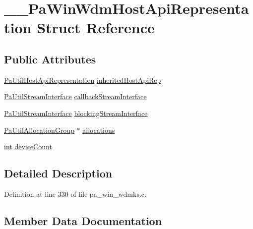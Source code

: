 \hypertarget{struct_____pa_win_wdm_host_api_representation}{}\section{\+\_\+\+\_\+\+Pa\+Win\+Wdm\+Host\+Api\+Representation Struct Reference}
\label{struct_____pa_win_wdm_host_api_representation}
\subsection*{Public Attributes}
\begin{DoxyCompactItemize}
\item 
\hyperlink{struct_pa_util_host_api_representation}{Pa\+Util\+Host\+Api\+Representation} \hyperlink{struct_____pa_win_wdm_host_api_representation_a73b6839eeeedfad62406b6929c26d3ad}{inherited\+Host\+Api\+Rep}
\item 
\hyperlink{struct_pa_util_stream_interface}{Pa\+Util\+Stream\+Interface} \hyperlink{struct_____pa_win_wdm_host_api_representation_af4dec3b34a520b1b2aa393fbca9e2c9e}{callback\+Stream\+Interface}
\item 
\hyperlink{struct_pa_util_stream_interface}{Pa\+Util\+Stream\+Interface} \hyperlink{struct_____pa_win_wdm_host_api_representation_a040a7b4993995b26c9128826a8644050}{blocking\+Stream\+Interface}
\item 
\hyperlink{struct_pa_util_allocation_group}{Pa\+Util\+Allocation\+Group} $\ast$ \hyperlink{struct_____pa_win_wdm_host_api_representation_aefaac80ee7c20f6ab43463d2a153d64c}{allocations}
\item 
\hyperlink{xmltok_8h_a5a0d4a5641ce434f1d23533f2b2e6653}{int} \hyperlink{struct_____pa_win_wdm_host_api_representation_a698d7764ee087e177079cca725c08686}{device\+Count}
\end{DoxyCompactItemize}


\subsection{Detailed Description}


Definition at line 330 of file pa\+\_\+win\+\_\+wdmks.\+c.



\subsection{Member Data Documentation}
